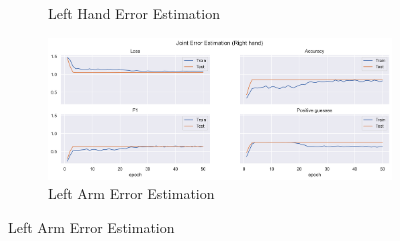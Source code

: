 \begin{figure}[!ht]
\begin{subfigure}[b]{0.47\linewidth}
        \caption{Left Hand Error Estimation}
        \label{fig:v2_leha_jt_ee}
    \end{subfigure}
    \hfill
    \begin{subfigure}[b]{0.47\linewidth}
        \centering
        \includegraphics[width=\textwidth]{figures/Results/v2/jt/Right hand_ErrorEstimation.png}
        \caption{Left Arm Error Estimation}
        \label{fig:v2_riha_jt_ee}
    \end{subfigure}
  \end{figure}
  

